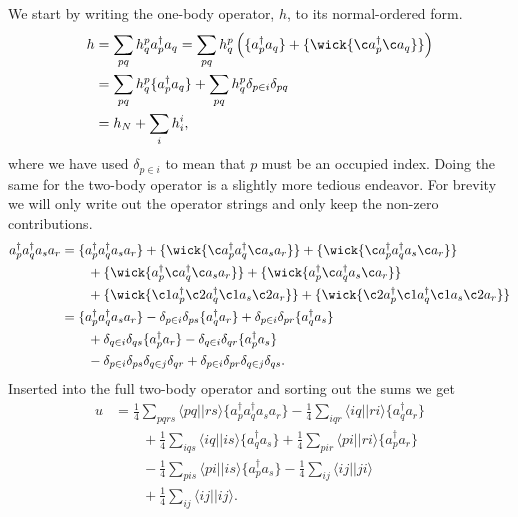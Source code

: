 \documentclass[
    a4paper, aps, twocolumn, floatfix, superscriptaddress,
    nofootinbib]{revtex4-1}
\newcommand{\1}{\mathds{1}}
\newcommand{\para}[1]{\left(#1\right)}
\newcommand{\bra}[1]{\langle #1\lvert}
\newcommand{\ket}[1]{\rvert #1\rangle}
\newcommand{\acr}[1]{a_{#1}^{\dagger}}
\newcommand{\ade}[1]{a_{#1}}
\begin{document}
    We start by writing the one-body operator, $h$, to its normal-ordered form.
    \begin{align}
        h &= \sum_{pq}h^p_q\acr{p}\ade{q}
        = \sum_{pq}h^p_q\para{
            \{\acr{p}\ade{q}\}
            + \{
                \wick{\c a_{p}^{\dagger} \c a_{q}}
            \}
        }
        \\
        &= \sum_{pq}h^p_q\{
            \acr{p}\ade{q}
        \}
        + \sum_{pq}h^p_q\delta_{p \in i}\delta_{pq}
        \\
        &= h_N + \sum_{i}h^i_i,
    \end{align}
    where we have used $\delta_{p \in i}$ to mean that $p$ must be an occupied
    index. Doing the same for the two-body operator is a slightly more tedious
    endeavor. For brevity we will only write out the operator strings and only
    keep the non-zero contributions.
    \begin{align}
        \acr{p}\acr{q}\ade{s}\ade{r}
        &=
        \{\acr{p}\acr{q}\ade{s}\ade{r}\}
        + \{
            \wick{\c a_p^{\dagger} a_{q}^{\dagger} \c a_{s} a_{r}}
        \}
        + \{
            \wick{\c a_p^{\dagger} a_{q}^{\dagger} a_{s} \c a_{r}}
        \}
        \nonumber \\
        &\qquad
        + \{
            \wick{a_p^{\dagger} \c a_{q}^{\dagger} \c a_{s} a_{r}}
        \}
        + \{
            \wick{a_p^{\dagger} \c a_{q}^{\dagger} a_{s} \c a_{r}}
        \}
        \nonumber \\
        &\qquad
        + \{
            \wick{\c1 a_p^{\dagger} \c2 a_{q}^{\dagger} \c1 a_{s} \c2 a_{r}}
        \}
        + \{
            \wick{\c2 a_p^{\dagger} \c1 a_{q}^{\dagger} \c1 a_{s} \c2 a_{r}}
        \}
        \\
        &=
        \{\acr{p}\acr{q}\ade{s}\ade{r}\}
        - \delta_{p \in i}\delta_{ps}\{\acr{q}\ade{r}\}
        + \delta_{p \in i}\delta_{pr}\{\acr{q}\ade{s}\}
        \nonumber \\
        &\qquad
        + \delta_{q \in i}\delta_{qs}\{\acr{p}\ade{r}\}
        - \delta_{q \in i}\delta_{qr}\{\acr{p}\ade{s}\}
        \nonumber \\
        &\qquad
        - \delta_{p \in i}\delta_{ps}\delta_{q \in j}\delta_{qr}
        + \delta_{p \in i}\delta_{pr}\delta_{q \in j}\delta_{qs}.
    \end{align}
    Inserted into the full two-body operator and sorting out the sums we get
    \begin{align}
        u
        &=
        \frac{1}{4}\sum_{pqrs}\bra{pq}\ket{rs}
        \{\acr{p}\acr{q}\ade{s}\ade{r}\}
        - \frac{1}{4}\sum_{iqr}\bra{iq}\ket{ri}\{\acr{q}\ade{r}\}
        \nonumber \\
        &\qquad
        + \frac{1}{4}\sum_{iqs}\bra{iq}\ket{is}\{\acr{q}\ade{s}\}
        + \frac{1}{4}\sum_{pir}\bra{pi}\ket{ri}\{\acr{p}\ade{r}\}
        \nonumber \\
        &\qquad
        - \frac{1}{4}\sum_{pis}\bra{pi}\ket{is}\{\acr{p}\ade{s}\}
        - \frac{1}{4}\sum_{ij}\bra{ij}\ket{ji}
        \nonumber \\
        &\qquad
        + \frac{1}{4}\sum_{ij}\bra{ij}\ket{ij}.
    \end{align}
\end{document}
